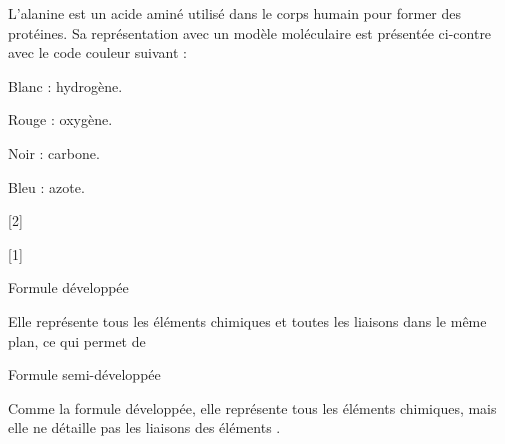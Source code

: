 \vspace*{8pt}
\begin{figure}
  \vspace*{-22pt}
\end{figure}

L'alanine est un acide aminé utilisé dans le corps humain pour former des protéines.
Sa représentation avec un modèle moléculaire est présentée ci-contre avec le code couleur suivant :
\begin{listePoints}[2]
  \item Blanc : hydrogène.
  \item Rouge : oxygène.
  \item Noir : carbone.
  \item Bleu : azote.
\end{listePoints}

\vfill
{}[2]

[1]


\pasCorrection{\newpage\vspace*{-30pt}}
\begin{doc}{Formule développée}
  \begin{importants}  
    Elle représente tous les éléments chimiques et toutes les liaisons dans le même plan, ce qui permet de 
  \end{importants}

  \exemple*
  \vspace*{-18pt}
  \begin{center}
    \qq{}
  \end{center}
\end{doc}


\begin{doc}{Formule semi-développée}
  \begin{importants}
    Comme la formule développée, elle représente tous les éléments chimiques, mais elle ne détaille pas les liaisons des éléments .
  \end{importants}

  \exemple*
  \vspace*{-8pt}
  \begin{center}
    \qq{}
  \end{center}
\end{doc}


